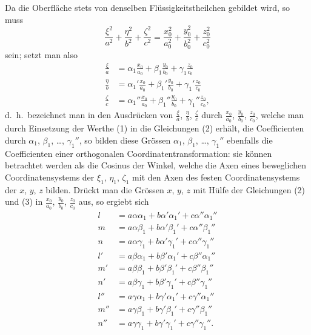 \documentclass[12pt,a4paper]{article}
\begin{document}
Da die Oberfl\"ache stets von denselben Fl\"ussigkeitstheilchen gebildet wird, so muss
\[
\frac{\xi^{2}}{a^{2}} + \frac{\eta^{2}}{b^{2}} + \frac{\zeta^{2}}{c^{2}} = \frac{x_{0}^{2}}{a_{0}^{2}} + \frac{y_{0}^{2}}{b_{0}^{2}} + \frac{z_{0}^{2}}{c_{0}^{2}}
\]
sein; setzt man also
\begin{align*}
\frac{\xi}{a} &= \alpha_{1}\frac{x_{0}}{a_{0}} + \beta_{1}\frac{y_{0}}{b_{0}} + \gamma_{1}\frac{z_{0}}{c_{0}}\\
\frac{\eta}{b} &= \alpha_{1}'\frac{x_{0}}{a_{0}} + \beta_{1}'\frac{y_{0}}{b_{0}} + \gamma_{1}'\frac{z_{0}}{c_{0}}\\
\frac{\zeta}{c} &= \alpha_{1}''\frac{x_{0}}{a_{0}} + \beta_{1}''\frac{y_{0}}{b_{0}} + \gamma_{1}''\frac{z_{0}}{c_{0}},\tag{3}
\end{align*}
d.~h.~bezeichnet man in den Ausdr\"ucken von $\frac{\xi}{a}$, $\frac{\eta}{b}$, $\frac{\zeta}{c}$ durch $\frac{x_{0}}{a_{0}}$, $\frac{y_{0}}{b_{0}}$, $\frac{z_{0}}{c_{0}}$, welche man durch Einsetzung der Werthe (1) in die Gleichungen (2) erh\"alt, die Coefficienten durch $\alpha_{1}$, $\beta_{1}$, \dots, $\gamma_{1}''$, so bilden diese Gr\"ossen $\alpha_{1}$, $\beta_{1}$, \dots, $\gamma_{1}''$ ebenfalls die Coefficienten einer orthogonalen Coordinatentransformation: sie k\"onnen betrachtet werden als die Cosinus der Winkel, welche die Axen eines beweglichen Coordinatensystems der $\xi_{1}$, $\eta_{1}$, $\zeta_{1}$ mit den Axen des festen Coordinatensystems der $x$, $y$, $z$ bilden. Dr\"uckt man die Gr\"ossen $x$, $y$, $z$ mit H\"ulfe der Gleichungen (2) und (3) in $\frac{x_{0}}{a_{0}}$, $\frac{y_{0}}{b_{0}}$, $\frac{z_{0}}{c_{0}}$ aus, so ergiebt sich
\begin{align*}
l &= a\alpha\alpha_{1} + b\alpha'\alpha_{1}' + c\alpha''\alpha_{1}''\\
m &= a\alpha\beta_{1} + b\alpha'\beta_{1}' + c\alpha''\beta_{1}''\\
n &= a\alpha\gamma_{1} + b\alpha'\gamma_{1}' + c\alpha''\gamma_{1}''\\
l' &= a\beta\alpha_{1} + b\beta'\alpha_{1}' + c\beta''\alpha_{1}''\\
m' &= a\beta\beta_{1} + b\beta'\beta_{1}' + c\beta''\beta_{1}''\\
n' &= a\beta\gamma_{1} + b\beta'\gamma_{1}' + c\beta''\gamma_{1}''\\
l'' &= a\gamma\alpha_{1} + b\gamma'\alpha_{1}' + c\gamma''\alpha_{1}''\\
m'' &= a\gamma\beta_{1} + b\gamma'\beta_{1}' + c\gamma''\beta_{1}''\\
n'' &= a\gamma\gamma_{1} + b\gamma'\gamma_{1}' + c\gamma''\gamma_{1}''.\tag{4}
\end{align*}
\end{document}
